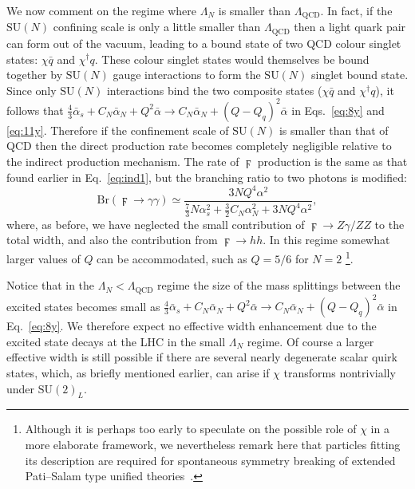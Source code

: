 We now comment on the regime where $\Lambda_{N}$ is smaller than
$\Lambda_{\text{QCD}}$. In fact, if the $\mathrm{SU}(N)$ confining scale is only
a little smaller than $\Lambda_{\text{QCD}}$ then a light quark pair can form
out of the vacuum, leading to a bound state of two QCD colour singlet states:
$\chi \bar{q}$ and $\chi^\dagger q$. These colour singlet states would
themselves be bound together by $\mathrm{SU}(N)$ gauge interactions to form the
$\mathrm{SU}(N)$ singlet bound state. Since only $\mathrm{SU}(N)$ interactions
bind the two composite states ($\chi \bar{q}$ and $\chi^\dagger q$), it follows
that
$\frac{4}{3} \bar \alpha_s + C_{N} \bar{\alpha}_{N} + Q^2 \bar{\alpha} \to C_{N} \bar{\alpha}_{N} + (Q - Q_q)^2 \bar{\alpha}$
in Eqs.~\ref{eq:8y} and \ref{eq:11y}. Therefore if the confinement scale of
$\mathrm{SU}(N)$ is smaller than that of QCD then the direct production rate
becomes completely negligible relative to the indirect production mechanism. The
rate of $\digamma$ production is the same as that found earlier in
Eq.~\ref{eq:ind1}, but the branching ratio to two photons is modified:
\begin{equation}
  \text{Br}(\digamma \rightarrow \gamma \gamma) \simeq \frac{3NQ^4 \alpha^2}{\frac{7}{3}N\alpha_{s}^2
    + \frac{3}{2} C_{N} \alpha_{N}^2 + 3NQ^4\alpha^2},
\end{equation}
where, as before, we have neglected the small contribution of $\digamma \rightarrow
Z\gamma / ZZ$ to the total width, and also the contribution from $\digamma \rightarrow hh$.
In this regime somewhat larger values of $Q$ can be accommodated, such as $Q = 5/6$ for $N=2$ \footnote{
  Although it is perhaps too early to speculate on the possible role of $\chi$ in a more elaborate framework,
  we nevertheless remark here that particles fitting its description are required for spontaneous symmetry breaking of
  extended Pati--Salam type unified theories~\cite{Foot:1990ij}.}.


Notice that in the $\Lambda_{N} < \Lambda_{\text{QCD}}$ regime the
size of the mass splittings between the excited states becomes small as
$\frac{4}{3} \bar \alpha_s + C_{N} \bar{\alpha}_{N} + Q^2 \bar{\alpha} \to
C_{N} \bar{\alpha}_{N} + (Q - Q_q)^2 \bar{\alpha} $ in Eq.~\ref{eq:8y}. We therefore
expect no effective width enhancement due to the excited state decays at the LHC
in the small $\Lambda_{N}$ regime. Of course a larger effective width is still possible if there are
several nearly degenerate scalar quirk states, which, as briefly mentioned earlier,
can arise if $\chi$ transforms nontrivially under $\mathrm{SU}(2)_{L}$.


